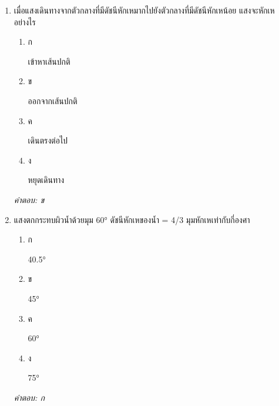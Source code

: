 \documentclass[12pt]{article}
\begin{document}
\begin{enumerate}[label=\arabic*., itemsep=0.5\baselineskip, topsep=0.5\baselineskip, leftmargin=*]
\item เมื่อแสงเดินทางจากตัวกลางที่มีดัชนีหักเหมากไปยังตัวกลางที่มีดัชนีหักเหน้อย แสงจะหักเหอย่างไร
\begin{enumerate}[label=\alph*)., itemsep=0.3\baselineskip, topsep=0.3\baselineskip]
\item ก\ 
\begin{minipage}[t]{0.9\linewidth}
\raggedright เข้าหาเส้นปกติ
\end{minipage}
\item ข\ 
\begin{minipage}[t]{0.9\linewidth}
\raggedright ออกจากเส้นปกติ
\end{minipage}
\item ค\ 
\begin{minipage}[t]{0.9\linewidth}
\raggedright เดินตรงต่อไป
\end{minipage}
\item ง\ 
\begin{minipage}[t]{0.9\linewidth}
\raggedright หยุดเดินทาง
\end{minipage}
\end{enumerate}
\vspace{-0.3\baselineskip}
\begin{small}
\textit{คำตอบ: ข}
\end{small}

\item แสงตกกระทบผิวน้ำด้วยมุม 60° ดัชนีหักเหของน้ำ = 4/3 มุมหักเหเท่ากับกี่องศา
\begin{enumerate}[label=\alph*)., itemsep=0.3\baselineskip, topsep=0.3\baselineskip]
\item ก\ 
\begin{minipage}[t]{0.9\linewidth}
\raggedright 40.5°
\end{minipage}
\item ข\ 
\begin{minipage}[t]{0.9\linewidth}
\raggedright 45°
\end{minipage}
\item ค\ 
\begin{minipage}[t]{0.9\linewidth}
\raggedright 60°
\end{minipage}
\item ง\ 
\begin{minipage}[t]{0.9\linewidth}
\raggedright 75°
\end{minipage}
\end{enumerate}
\vspace{-0.3\baselineskip}
\begin{small}
\textit{คำตอบ: ก}
\end{small}


\end{enumerate}
\end{document}
